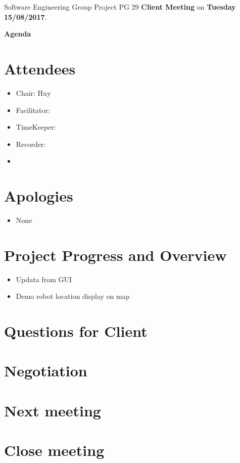 \documentclass[11pt, a4paper]{article}
\begin{document}
\noindent Software Engineering Group Project PG 29 {\bf Client Meeting} on {\bf Tuesday 15/08/2017}.
\vspace*{10pt}
\begin{center}
\huge \bf Agenda
\end{center}

\section{Attendees}
\begin{itemize}
\item Chair: Huy
\item Facilitator: 
\item TimeKeeper: 
\item Recorder: 
\item 
\end{itemize}

\section{Apologies}
\begin{itemize}
\item None
\end{itemize}

\section{Project Progress and Overview}
\begin{itemize}
	\item Updata from GUI 
	\item Demo robot location display on map
\end{itemize}


\section{Questions for Client}
\section{Negotiation}


\section{Next meeting}

\section {Close meeting}
\vspace*{10pt}
\end{document}
